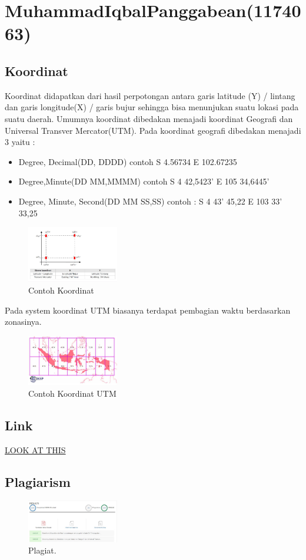 \section{MuhammadIqbalPanggabean(1174063)}

\subsection{Koordinat}
Koordinat didapatkan dari hasil perpotongan antara garis latitude (Y) / lintang dan garis longitude(X) / garis bujur sehingga bisa menunjukan suatu lokasi pada suatu daerah. \hfill\break 
Umumnya koordinat dibedakan menajadi koordinat Geografi dan Universal Transver Mercator(UTM). Pada koordinat geografi dibedakan menajadi 3 yaitu : \hfill\break
\begin{itemize}
	\item Degree, Decimal(DD, DDDD) contoh S 4.56734 E 102.67235
	\item Degree,Minute(DD MM,MMMM) contoh S 4 42,5423’ E 105 34,6445’
	\item Degree, Minute, Second(DD MM SS,SS) contoh : S 4 43’ 45,22 E 103 33’ 33,25
\end{itemize}
\hfill\break
\begin{figure}[H]
	\includegraphics[width=4cm]{figures/1174063/koordinat.jpg}
	\centering
	\caption{Contoh Koordinat}
\end{figure}
Pada system koordinat UTM biasanya terdapat pembagian waktu berdasarkan zonasinya. \hfill\break
\begin{figure}[H]
	\includegraphics[width=4cm]{figures/1174063/utm.jpg}
	\centering
	\caption{Contoh Koordinat UTM}
\end{figure}

	\subsection{Link}
\href{https://youtu.be/mU4dPSOHDWI}{LOOK AT THIS}
\subsection{Plagiarism}
\begin{figure}[H]
	\includegraphics[width=4cm]{figures/1174063/plagiat.jpg}
	\centering
	\caption{Plagiat.}
\end{figure}

